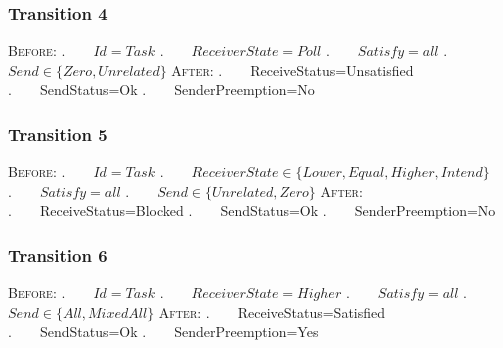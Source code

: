 \subsubsection{Transition 4}


\textsc{Before:}
\newline.~~~~$Id=Task$
\newline.~~~~$ReceiverState=Poll$
\newline.~~~~$Satisfy=all$
\newline.~~~~$Send \in \{Zero,Unrelated\}$
\newline\textsc{After:}
\newline.~~~~ReceiveStatus=Unsatisfied
\newline.~~~~SendStatus=Ok
\newline.~~~~SenderPreemption=No

\subsubsection{Transition 5}


\textsc{Before:}
\newline.~~~~$Id=Task$
\newline.~~~~$ReceiverState \in \{Lower,Equal,Higher,Intend\}$
\newline.~~~~$Satisfy=all$
\newline.~~~~$Send \in \{Unrelated,Zero\}$
\newline\textsc{After:}
\newline.~~~~ReceiveStatus=Blocked
\newline.~~~~SendStatus=Ok
\newline.~~~~SenderPreemption=No

\subsubsection{Transition 6}


\textsc{Before:}
\newline.~~~~$Id=Task$
\newline.~~~~$ReceiverState=Higher$
\newline.~~~~$Satisfy=all$
\newline.~~~~$Send \in \{All,MixedAll\}$
\newline\textsc{After:}
\newline.~~~~ReceiveStatus=Satisfied
\newline.~~~~SendStatus=Ok
\newline.~~~~SenderPreemption=Yes

